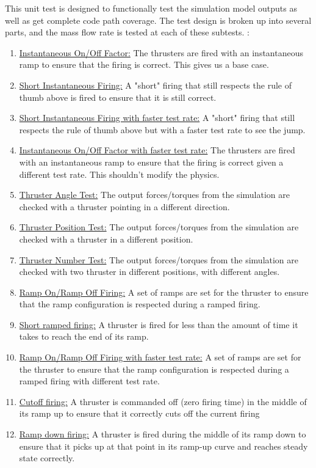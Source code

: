 \noindent This unit test is designed to functionally test the simulation model 
outputs as well as get complete code path coverage. 
The test design is broken 
up into several parts, and the mass flow rate is tested at each of these subtests. :\\
\begin{enumerate}
\item{\underline{Instantaneous On/Off Factor:} The thrusters are fired with an 
  instantaneous ramp to ensure that the firing is correct. This gives us a base case.}
\item{\underline{Short Instantaneous Firing:} A "short" firing that still respects the 
  rule of thumb above is fired to ensure that it is still correct.}
 \item{\underline{Short Instantaneous Firing with faster test rate:} A "short" firing that still respects the 
  rule of thumb above but with a faster test rate to see the jump.}
 \item{\underline{Instantaneous On/Off Factor with faster test rate:} The thrusters are fired with an 
  instantaneous ramp to ensure that the firing is correct given a different test rate. This shouldn't modify the physics.}
 \item{\underline{Thruster Angle Test:} The output forces/torques from the simulation 
  are checked with a thruster pointing in a different direction.}
   \item{\underline{Thruster Position Test:} The output forces/torques from the simulation 
  are checked with a thruster in a different position.}
   \item{\underline{Thruster Number Test:} The output forces/torques from the simulation 
  are checked with two thruster in different positions, with different angles.}
\item{\underline{Ramp On/Ramp Off Firing:} A set of ramps are set for the thruster to ensure 
  that the ramp configuration is respected during a ramped firing.}
  \item{\underline{Short ramped firing:} A thruster is fired for less than the amount of time it 
   takes to reach the end of its ramp.}
\item{\underline{Ramp On/Ramp Off Firing with faster test rate:} A set of ramps are set for the thruster to ensure 
  that the ramp configuration is respected during a ramped firing with different test rate.}
\item{\underline{Cutoff firing:} A thruster is commanded off (zero firing time) in the middle 
   of its ramp up to ensure that it correctly cuts off the current firing}
\item{\underline{Ramp down firing:} A thruster is fired during the middle of its ramp down 
   to ensure that it picks up at that point in its ramp-up curve and reaches 
   steady state correctly.}
\end{enumerate}

